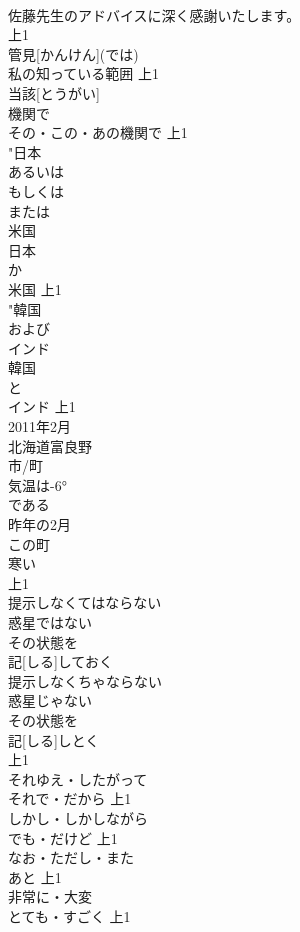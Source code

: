\documentclass[8pt]{extreport}
\begin{document}
\begin{CJK}{UTF8}{min}
\\	佐藤先生のアドバイスに深く感謝いたします。
\\	上1
\\	管見[かんけん](では)	
\\	私の知っている範囲			上1
\\	当該[とうがい]
\\	機関で
\\	その・この・あの機関で			上1
\\	"日本
\\	あるいは
\\	もしくは
\\	または
\\	米国
\\	日本
\\	か
\\	米国			上1
\\	"韓国
\\	および
\\	インド
\\	韓国
\\	と
\\	インド			上1
\\	2011年2月
\\	北海道富良野
\\	市/町
\\	気温は-6°
\\	である
\\	昨年の2月
\\	この町
\\	寒い
\\	上1
\\	提示しなくてはならない
\\	惑星ではない
\\	その状態を
\\	記[しる]しておく
\\	提示しなくちゃならない
\\	惑星じゃない
\\	その状態を
\\	記[しる]しとく
\\	上1
\\	それゆえ・したがって	
\\	それで・だから			上1
\\	しかし・しかしながら	
\\	でも・だけど			上1
\\	なお・ただし・また	
\\	あと			上1
\\	非常に・大変	
\\	とても・すごく			上1

\end{CJK}
\end{document}
